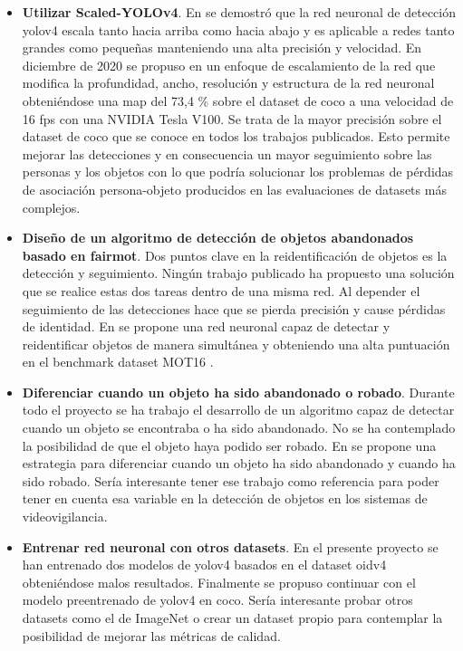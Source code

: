 \begin{itemize}
    \item \textbf{Utilizar Scaled-YOLOv4}. En \cite{bochkovskiy2020yolov4} se demostró que la red neuronal de detección \gls{yolov4} escala tanto hacia arriba como hacia abajo y es aplicable a redes tanto grandes como pequeñas manteniendo una alta precisión y velocidad. En diciembre de 2020 se propuso en \cite{wang2021scaledyolov4} un enfoque de escalamiento de la red que modifica la profundidad, ancho, resolución y estructura de la red neuronal obteniéndose una \gls{map} del 73,4 \% sobre el dataset de \gls{coco} a una velocidad de 16 \gls{fps} con una NVIDIA Tesla V100. Se trata de la mayor precisión sobre el dataset de \gls{coco} que se conoce en todos los trabajos publicados. Esto permite mejorar las detecciones y en consecuencia un mayor seguimiento sobre las personas y los objetos con lo que podría solucionar los problemas de pérdidas de asociación persona-objeto producidos en las evaluaciones de datasets más complejos.
    \item \textbf{Diseño de un algoritmo de detección de objetos abandonados basado en \gls{fairmot}}. Dos puntos clave en la reidentificación de objetos es la detección y seguimiento. Ningún trabajo publicado ha propuesto una solución que se realice estas dos tareas dentro de una misma red. Al depender el seguimiento de las detecciones hace que se pierda precisión y cause pérdidas de identidad. En \cite{zhang2020fair} se propone una red neuronal capaz de detectar y reidentificar objetos de manera simultánea y obteniendo una alta puntuación en el benchmark dataset MOT16 \cite{milan2016mot16}.
    \item \textbf{Diferenciar cuando un objeto ha sido abandonado o robado}. Durante todo el proyecto se ha trabajo el desarrollo de un algoritmo capaz de detectar cuando un objeto se encontraba o ha sido abandonado. No se ha contemplado la posibilidad de que el objeto haya podido ser robado. En \cite{9079525} se propone una estrategia para diferenciar cuando un objeto ha sido abandonado y cuando ha sido robado. Sería interesante tener ese trabajo como referencia para poder tener en cuenta esa variable en la detección de objetos en los sistemas de videovigilancia.
    \item \textbf{Entrenar red neuronal con otros datasets}. En el presente proyecto se han entrenado dos modelos de \gls{yolov4} basados en el dataset \gls{oidv4} obteniéndose malos resultados. Finalmente se propuso continuar con el modelo preentrenado de \gls{yolov4} en \gls{coco}. Sería interesante probar otros datasets como el de ImageNet \cite{russakovsky2015imagenet} o crear un dataset propio para contemplar la posibilidad de mejorar las métricas de calidad.

\end{itemize}

